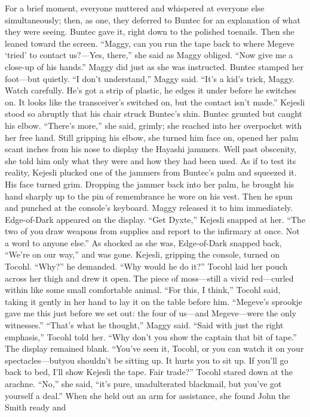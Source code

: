 \documentclass[9pt]{article}
\begin{document}
For a brief moment, everyone muttered and whispered at everyone else simultaneously; then, as one,
they deferred to Buntec for an explanation of what they were seeing.
Buntec gave it, right down to the polished toenails. Then she leaned toward the screen. “Maggy, can
you run the tape back to where Megeve ‘tried’ to contact us?—Yes, there,” she said as Maggy obliged.
“Now give me a close-up of his hands.” Maggy did just as she was instructed. Buntec stamped her
foot—but quietly.
“I don’t understand,” Maggy said.
“It’s a kid’s trick, Maggy. Watch carefully. He’s got a strip of plastic, he edges it under before he
switches on. It looks like the transceiver’s switched on, but the contact isn’t made.”
Kejesli stood so abruptly that his chair struck Buntec’s shin.
Buntec grunted but caught his elbow. “There’s more,” she said, grimly; she reached into her
overpocket with her free hand. Still gripping his elbow, she turned him face on, opened her palm scant
inches from his nose to display the Hayashi jammers. Well past obscenity, she told him only what they
were and how they had been used.
As if to test its reality, Kejesli plucked one of the jammers from Buntec’s palm and squeezed it. His
face turned grim. Dropping the jammer back into her palm, he brought his hand sharply up to the pin of
remembrance he wore on his vest.
Then he spun and punched at the console’s keyboard. Maggy released it to him immediately.
Edge-of-Dark appeared on the display. “Get Dyxte,” Kejesli snapped at her. “The two of you draw
weapons from supplies and report to the infirmary at once. Not a word to anyone else.”
As shocked as she was, Edge-of-Dark snapped back, “We’re on our way,” and was gone.
Kejesli, gripping the console, turned on Tocohl. “Why?” he demanded. “Why would he do it?”
Tocohl laid her pouch across her thigh and drew it open. The piece of moss—still a vivid
red—curled within like some small comfortable animal. “For this, I think,” Tocohl said, taking it gently in
her hand to lay it on the table before him. “Megeve’s sprookje gave me this just before we set out: the
four of us—and Megeve—were the only witnesses.”
“That’s what he thought,” Maggy said.
“Said with just the right emphasis,” Tocohl told her. “Why don’t you show the captain that bit of
tape.”
The display remained blank. “You’ve seen it, Tocohl, or you can watch it on your spectacles—butyou shouldn’t be sitting up. It hurts you to sit up. If you’ll go back to bed, I’ll show Kejesli the tape. Fair
trade?”
Tocohl stared down at the arachne. “No,” she said, “it’s pure, unadulterated blackmail, but you’ve
got yourself a deal.” When she held out an arm for assistance, she found John the Smith ready and
\end{document}
